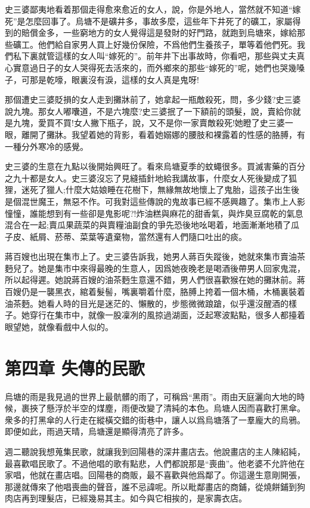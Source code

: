 \documentclass[a6paper]{article}
\begin{document}
史三婆鄙夷地看着那個走得愈來愈近的女人，說，你是外地人，當然就不知道“嫁死”是怎麼回事了。烏塘不是礦井多，事故多麼，這些年下井死了的礦工，家屬得到的賠償金多，一些窮地方的女人覺得這是發財的好門路，就跑到烏塘來，嫁給那些礦工。他們給自家男人買上好幾份保險，不爲他們生養孩子，單等着他們死。我們私下裏就管這樣的女人叫“嫁死的”。前年井下出事故時，你看吧，那些與丈夫真心實意過日子的女人哭得死去活來的，而外鄉來的那些“嫁死的”呢，她們也哭幾嗓子，可那是乾嚎，眼裏沒有淚，這樣的女人真是鬼呀!

那個遭史三婆貶損的女人走到攤牀前了，她拿起一瓶敵殺死，問，多少錢?史三婆說九塊。那女人嘟囔道，不是六塊麼?史三婆抿了一下額前的頭髮，說，賣給你就是九塊，愛買不買!女人撇下瓶子，說，又不是你一家賣敵殺死!她瞪了史三婆一眼，離開了攤牀。我望着她的背影，看着她嫋娜的腰肢和裸露着的性感的胳膊，有一種分外寒冷的感覺。

史三婆的生意在九點以後開始興旺了。看來烏塘夏季的蚊蠅很多。買滅害藥的百分之九十都是女人。史三婆沒忘了見縫插針地給我講故事，什麼女人死後變成了狐狸，迷死了獵人;什麼大姑娘睡在花樹下，無緣無故地懷上了鬼胎，這孩子出生後是個混世魔王，無惡不作。可我對這些傳說的鬼故事已經不感興趣了。集市上人影憧憧，誰能想到有一些卻是鬼影呢?!炸油糕與麻花的甜香氣，與炸臭豆腐乾的氣息混合在一起;賣瓜果蔬菜的與賣糧油副食的爭先恐後地吆喝着，地面漸漸地積了瓜子皮、紙屑、菸蒂、菜葉等遺棄物，當然還有人們隨口吐出的痰。

蔣百嫂也出現在集市上了。史三婆告訴我，她男人蔣百失蹤後，她就來集市賣油茶麪兒了。她是集市中來得最晚的生意人，因爲她夜晚老是喝酒後帶男人回家鬼混，所以起得遲。她說蔣百嫂的油茶麪生意還不錯，男人們很喜歡猴在她的攤牀前。蔣百嫂仍是一襲黑衣，綰着髮髻，嘴裏嚼着什麼，胳膊上挎着一個木桶，木桶裏裝着油茶麪。她看人時的目光是迷茫的、懶散的，步態微微踉蹌，似乎還沒醒酒的樣子。她穿行在集市中，就像一股凜冽的風掠過湖面，泛起寒波點點，很多人都擡着眼望她，就像看戲中人似的。

\pagebreak

\section{第四章 失傳的民歌}

烏塘的雨是我見過的世界上最骯髒的雨了，可稱爲“黑雨”。雨由天庭灑向大地的時候，裹挾了懸浮於半空的煤塵，雨便改變了清純的本色。烏塘人因而喜歡打黑傘。衆多的打黑傘的人行走在縱橫交錯的街巷中，讓人以爲烏塘落了一羣龐大的烏鴉。即便如此，雨過天晴，烏塘還是顯得清亮了許多。

週二聽說我想蒐集民歌，就讓我到回陽巷的深井畫店去。他說畫店的主人陳紹純，最喜歡唱民歌了。不過他唱的歌有點悲，人們都說那是“喪曲”。他老婆不允許他在家唱，他就在畫店唱。回陽巷的商販，最不喜歡與他爲鄰了。你這邊生意剛開張，那邊就傳來了他唱喪曲的聲音，誰不忌諱呢。所以毗鄰畫店的商鋪，從燒餅鋪到狗肉店再到理髮店，已經幾易其主。如今與它相挨的，是家壽衣店。
\end{document}
